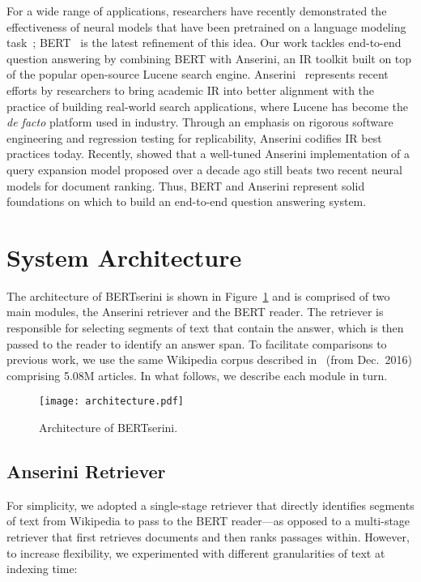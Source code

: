 \documentclass[11pt,a4paper]{article}
\begin{document}
For a wide range of applications, researchers have recently demonstrated the effectiveness of neural models that have been pretrained on a language modeling task~\cite{N18-1202,radford2018improving}; BERT~\cite{devlin2018bert} is the latest refinement of this idea.
Our work tackles end-to-end question answering by combining BERT with Anserini, an IR toolkit built on top of the popular open-source Lucene search engine.
Anserini~\cite{Yang_etal_SIGIR2017,Yang_etal_JDIQ2018} represents recent efforts by researchers to bring academic IR into better alignment with the practice of building real-world search applications, where Lucene has become the {\it de facto} platform used in industry.
Through an emphasis on rigorous software engineering and regression testing for replicability, Anserini codifies IR best practices today.
Recently, \citet{Lin_SIGIRForum2018} showed that a well-tuned Anserini implementation of a query expansion model proposed over a decade ago still beats two recent neural models for document ranking.
Thus, BERT and Anserini represent solid foundations on which to build an end-to-end question answering system.

\section{System Architecture}

The architecture of BERTserini is shown in Figure~\ref{fig:framework} and is comprised of two main modules, the Anserini retriever and the BERT reader.
The retriever is responsible for selecting segments of text that contain the answer, which is then passed to the reader to identify an answer span.
To facilitate comparisons to previous work, we use the same Wikipedia corpus described in~\citet{P17-1171} (from Dec.\ 2016) comprising 5.08M articles.
In what follows, we describe each module in turn.

\begin{figure}[t]
\centering
  \texttt{[image: architecture.pdf]}
\caption{Architecture of BERTserini.}
\label{fig:framework}
\end{figure}

\subsection{Anserini Retriever}

For simplicity, we adopted a single-stage retriever that directly identifies segments of text from Wikipedia to pass to the BERT reader---as opposed to a multi-stage retriever that first retrieves documents and then ranks passages within.
However, to increase flexibility, we experimented with different granularities of text at indexing time:
\end{document}
